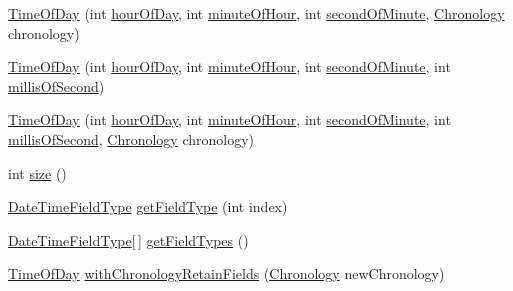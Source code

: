 \begin{DoxyCompactItemize}
\item 
\hyperlink{classorg_1_1joda_1_1time_1_1_time_of_day_a8244df19a3f14969ce6a14112dd71dbb}{Time\-Of\-Day} (int \hyperlink{classorg_1_1joda_1_1time_1_1_time_of_day_a8dd140a8112cba92d90d8bcb00a1764b}{hour\-Of\-Day}, int \hyperlink{classorg_1_1joda_1_1time_1_1_time_of_day_ac30a9f76ce74ec5b0337a7e860b9668f}{minute\-Of\-Hour}, int \hyperlink{classorg_1_1joda_1_1time_1_1_time_of_day_af0c5da02c644c96420b4faa14b9a58b2}{second\-Of\-Minute}, \hyperlink{classorg_1_1joda_1_1time_1_1_chronology}{Chronology} chronology)
\item 
\hyperlink{classorg_1_1joda_1_1time_1_1_time_of_day_a198e29a67a4c157a2f78b2038b50c3cf}{Time\-Of\-Day} (int \hyperlink{classorg_1_1joda_1_1time_1_1_time_of_day_a8dd140a8112cba92d90d8bcb00a1764b}{hour\-Of\-Day}, int \hyperlink{classorg_1_1joda_1_1time_1_1_time_of_day_ac30a9f76ce74ec5b0337a7e860b9668f}{minute\-Of\-Hour}, int \hyperlink{classorg_1_1joda_1_1time_1_1_time_of_day_af0c5da02c644c96420b4faa14b9a58b2}{second\-Of\-Minute}, int \hyperlink{classorg_1_1joda_1_1time_1_1_time_of_day_a9123463c9034f7bc85f4234cf97176f6}{millis\-Of\-Second})
\item 
\hyperlink{classorg_1_1joda_1_1time_1_1_time_of_day_a98ed57bbb311cfc145cfba80e0a84d60}{Time\-Of\-Day} (int \hyperlink{classorg_1_1joda_1_1time_1_1_time_of_day_a8dd140a8112cba92d90d8bcb00a1764b}{hour\-Of\-Day}, int \hyperlink{classorg_1_1joda_1_1time_1_1_time_of_day_ac30a9f76ce74ec5b0337a7e860b9668f}{minute\-Of\-Hour}, int \hyperlink{classorg_1_1joda_1_1time_1_1_time_of_day_af0c5da02c644c96420b4faa14b9a58b2}{second\-Of\-Minute}, int \hyperlink{classorg_1_1joda_1_1time_1_1_time_of_day_a9123463c9034f7bc85f4234cf97176f6}{millis\-Of\-Second}, \hyperlink{classorg_1_1joda_1_1time_1_1_chronology}{Chronology} chronology)
\item 
int \hyperlink{classorg_1_1joda_1_1time_1_1_time_of_day_a75d92ceb05a03d66e12d5e23580f17d3}{size} ()
\item 
\hyperlink{classorg_1_1joda_1_1time_1_1_date_time_field_type}{Date\-Time\-Field\-Type} \hyperlink{classorg_1_1joda_1_1time_1_1_time_of_day_a7ce0fde8cd274852eeb9f2434b7b2864}{get\-Field\-Type} (int index)
\item 
\hyperlink{classorg_1_1joda_1_1time_1_1_date_time_field_type}{Date\-Time\-Field\-Type}\mbox{[}$\,$\mbox{]} \hyperlink{classorg_1_1joda_1_1time_1_1_time_of_day_a6395386165b53cc3c9d5a8053487f44c}{get\-Field\-Types} ()
\item 
\hyperlink{classorg_1_1joda_1_1time_1_1_time_of_day}{Time\-Of\-Day} \hyperlink{classorg_1_1joda_1_1time_1_1_time_of_day_a5f4fed672be561513d2ed200d16f9351}{with\-Chronology\-Retain\-Fields} (\hyperlink{classorg_1_1joda_1_1time_1_1_chronology}{Chronology} new\-Chronology)

\end{DoxyCompactItemize}
